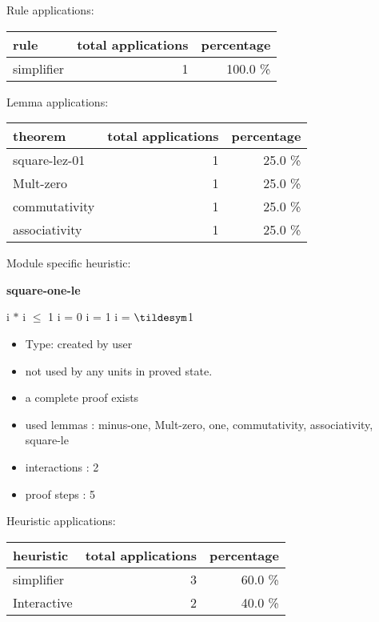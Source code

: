 \documentclass[a4paper]{article}
\begin{document}
Rule applications:

\begin{supertabular}{l|r|r}
rule	        & total applications & percentage \\ \hline
simplifier & 1 & 100.0 \% \\

\end{supertabular}

Lemma applications:

\begin{supertabular}{l|r|r}
theorem	        & total applications & percentage \\ \hline
square-lez-01 & 1 & 25.0 \% \\
Mult-zero & 1 & 25.0 \% \\
commutativity & 1 & 25.0 \% \\
associativity & 1 & 25.0 \% \\

\end{supertabular}

Module specific heuristic:

\pagebreak

{\LARGE\bf square-one-le}\label{lemma-square-one-le}

\medskip

 \Fol i $*$ i $\le$ 1 \Equiv i = 0 \Or i = 1 \Or i = $\tildesym$1

\begin{itemize}

\item Type: created by user

\item not used by any units in proved state.
\item       a complete proof exists
\item       used lemmas  : minus-one, Mult-zero, one, commutativity, associativity, square-le
\item       interactions : 2
\item       proof steps  : 5
\end{itemize}

\medskip


Heuristic applications:

\begin{supertabular}{l|r|r}
heuristic	& total applications & percentage \\ \hline
simplifier & 3 & 60.0 \% \\
Interactive & 2 & 40.0 \% \\

\end{supertabular}
\end{document}
